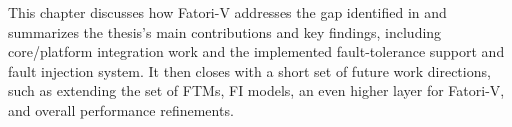 This chapter discusses how \ac{Fatori-V} addresses the gap identified in  and summarizes the thesis’s main contributions and key findings, including core/platform integration work and the implemented fault-tolerance support and fault injection system. It then closes with a short set of future work directions, such as extending the set of \acp{FTM}, \ac{FI} models, an even higher layer for \ac{Fatori-V}, and overall performance refinements.

